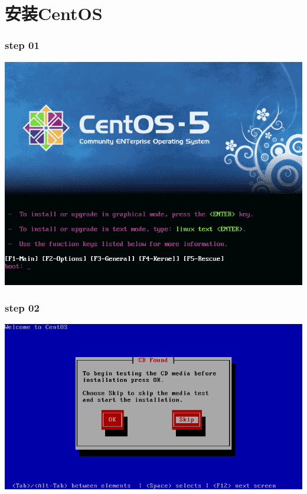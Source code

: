 \documentclass[xcolor=svgnames,presentation]{beamer}
\begin{document}
\section{安装CentOS}
\label{sec-2}
\begin{frame}
\frametitle{step 01}
\label{sec-2-1}

\begin{center}
\includegraphics[width=.9\linewidth]{img/img01.png}
\end{center}
\end{frame}
\begin{frame}
\frametitle{step 02}
\label{sec-2-2}

\begin{center}
\includegraphics[width=.9\linewidth]{img/img04.png}
\end{center}
\end{frame}
\end{document}
